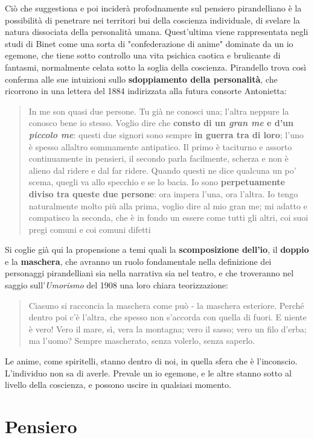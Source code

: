 \documentclass[a4paper, twoside, titlepage]{book}
\newcommand{\citazione}[1]{%
  \begin{quotation}
  \noindent #1
  \end{quotation}}
\begin{document}
Ciò che suggestiona e poi inciderà profodnamente sul pensiero pirandelliano è la possibilità di penetrare nei territori bui della coscienza individuale, di svelare la natura dissociata della personalità umana. Quest'ultima viene rappresentata negli studi di Binet come una sorta di "confederazione di anime" dominate da un io egemone, che tiene sotto controllo una vita psichica caotica e brulicante di fantasmi, normalmente celata sotto la soglia della coscienza. Pirandello trova così conferma alle sue intuizioni sullo \textbf{sdoppiamento della personalità}, che ricorrono in una lettera del 1884 indirizzata alla futura consorte Antonietta:

\citazione{In me son quasi due persone. Tu già ne conosci una; l'altra neppure la conosco bene io stesso. Voglio dire che \textbf{consto di un \textit{gran me} e d'un \textit{piccolo me}}: questi due signori sono sempre \textbf{in guerra tra di loro}; l'uno è spesso allaltro sommamente antipatico. Il primo è taciturno e assorto continuamente in pensieri, il secondo parla facilmente, scherza e non è alieno dal ridere e dal far ridere. Quando questi ne dice qualcuna un po' scema, quegli va allo specchio e se lo bacia. Io sono \textbf{perpetuamente diviso tra queste due persone}: ora impera l'una, ora l'altra. Io tengo naturalmente molto più alla prima, voglio dire al mio gran me; mi adatto e compatisco la seconda, che è in fondo un essere come tutti gli altri, coi suoi pregi comuni e coi comuni difetti}

Si coglie già qui la propensione a temi quali la \textbf{scomposizione dell'io}, il \textbf{doppio} e la \textbf{maschera}, che avranno un ruolo fondamentale nella definizione dei personaggi pirandelliani sia nella narrativa sia nel teatro, e che troveranno nel saggio sull'\textit{Umorismo} del 1908 una loro chiara teorizzazione:

\citazione{Ciasuno si racconcia la maschera come può - la maschera esteriore. Perché dentro poi c'è l'altra, che spesso non s'accorda con quella di fuori. E niente è vero! Vero il mare, sì, vera la montagna; vero il sasso; vero un filo d'erba; ma l'uomo? Sempre mascherato, senza volerlo, senza saperlo.}

Le anime, come spiritelli, stanno dentro di noi, in quella sfera che è l'inconscio. L'individuo non sa di averle. Prevale un io egemone, e le altre stanno sotto al livello della coscienza, e possono uscire in qualsiasi momento.

\section{Pensiero}
\end{document}
